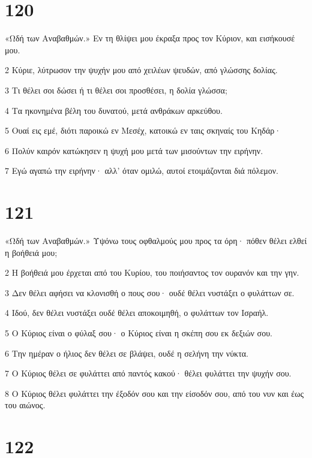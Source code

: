 \chapter{120}

\par «Ωδή των Αναβαθμών.» Εν τη θλίψει μου έκραξα προς τον Κύριον, και εισήκουσέ μου.
\par 2 Κύριε, λύτρωσον την ψυχήν μου από χειλέων ψευδών, από γλώσσης δολίας.
\par 3 Τι θέλει σοι δώσει ή τι θέλει σοι προσθέσει, η δολία γλώσσα;
\par 4 Τα ηκονημένα βέλη του δυνατού, μετά ανθράκων αρκεύθου.
\par 5 Ουαί εις εμέ, διότι παροικώ εν Μεσέχ, κατοικώ εν ταις σκηναίς του Κηδάρ·
\par 6 Πολύν καιρόν κατώκησεν η ψυχή μου μετά των μισούντων την ειρήνην.
\par 7 Εγώ αγαπώ την ειρήνην· αλλ' όταν ομιλώ, αυτοί ετοιμάζονται διά πόλεμον.

\chapter{121}

\par «Ωδή των Αναβαθμών.» Υψόνω τους οφθαλμούς μου προς τα όρη· πόθεν θέλει ελθεί η βοήθειά μου;
\par 2 Η βοήθειά μου έρχεται από του Κυρίου, του ποιήσαντος τον ουρανόν και την γην.
\par 3 Δεν θέλει αφήσει να κλονισθή ο πους σου· ουδέ θέλει νυστάξει ο φυλάττων σε.
\par 4 Ιδού, δεν θέλει νυστάξει ουδέ θέλει αποκοιμηθή, ο φυλάττων τον Ισραήλ.
\par 5 Ο Κύριος είναι ο φύλαξ σου· ο Κύριος είναι η σκέπη σου εκ δεξιών σου.
\par 6 Την ημέραν ο ήλιος δεν θέλει σε βλάψει, ουδέ η σελήνη την νύκτα.
\par 7 Ο Κύριος θέλει σε φυλάττει από παντός κακού· θέλει φυλάττει την ψυχήν σου.
\par 8 Ο Κύριος θέλει φυλάττει την έξοδόν σου και την είσοδόν σου, από του νυν και έως του αιώνος.

\chapter{122}

